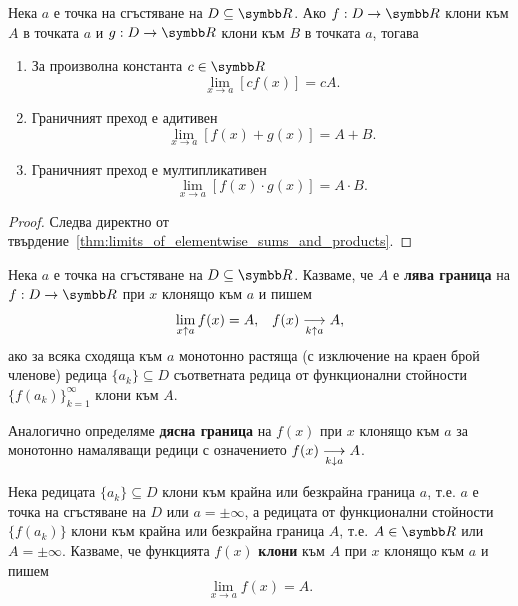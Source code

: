 \documentclass[numbers=endperiod, bibliography=totocnumbered]{scrartcl}
\begin{document}
\begin{proposition}\label{thm:limit_is_linear_and_multiplicative}
  Нека \( a \) е точка на сгъстяване на \( D \subseteq \R \). Ако \( f: D \to \R \) клони към \( A \) в точката \( a \) и \( g: D \to \R \) клони към \( B \) в точката \( a \), тогава
  \begin{enumerate}
    \item За произволна константа \( c \in \R \)
    \begin{equation*}
      \lim_{x \to a} [c f(x)] = c A.
    \end{equation*}

    \item Граничният преход е адитивен
    \begin{equation*}
      \lim_{x \to a} [f(x) + g(x)] = A + B.
    \end{equation*}

    \item Граничният преход е мултипликативен
    \begin{equation*}
      \lim_{x \to a} [f(x) \cdot g(x)] = A \cdot B.
    \end{equation*}
  \end{enumerate}
\end{proposition}
\begin{proof}
  Следва директно от твърдение~\ref{thm:limits_of_elementwise_sums_and_products}.
\end{proof}

\begin{definition}
  Нека \( a \) е точка на сгъстяване на \( D \subseteq \R \). Казваме, че \( A \) е \textbf{лява граница} на \( f: D \to \R \) при \( x \) клонящо към \( a \) и пишем
  \begin{align*}
    \lim_{x \uparrow a} f(x) = A,
    &&
    f(x) \Conv[k \uparrow a]{} A,
  \end{align*}
  ако за всяка сходяща към \( a \) монотонно растяща (с изключение на краен брой членове) редица \( \{ a_k \} \subseteq D \) съответната редица от функционални стойности \( {\{ f(a_k) \}}_{k=1}^\infty \) клони към \( A \).

  Аналогично определяме \textbf{дясна граница} на \( f(x) \) при \( x \) клонящо към \( a \) за монотонно намаляващи редици с означението \( f(x) \Conv[k \downarrow a]{} A \).
\end{definition}

\begin{definition}
  Нека редицата \( \{ a_k \} \subseteq D \) клони към крайна или безкрайна граница \( a \), т.е. \( a \) е точка на сгъстяване на \( D \) или \( a = \pm \infty \), а редицата от функционални стойности \( \{ f(a_k) \} \) клони към крайна или безкрайна граница \( A \), т.е. \( A \in \R \) или \( A = \pm \infty \). Казваме, че функцията \( f(x) \) \textbf{клони} към \( A \) при \( x \) клонящо към \( a \) и пишем
  \begin{equation*}
    \lim_{x \to a} f(x) = A.
  \end{equation*}
\end{definition}
\end{document}
